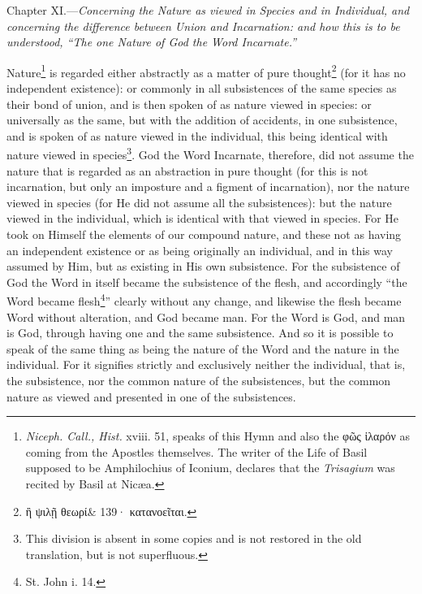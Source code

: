 Chapter XI.—\emph{Concerning the Nature as viewed in Species and in Individual, and concerning the difference between Union and Incarnation: and how this is to be understood, “The one Nature of God the Word Incarnate.”}

Nature\footnote{\emph{Niceph. Call., Hist. }xviii. 51, speaks of this Hymn and also the \textgreek{φῶς ἱλαρόν} as coming from the Apostles themselves. The writer of the Life of Basil supposed to be Amphilochius of Iconium, declares that the \emph{Trisagium }was recited by Basil at Nicæa.} is regarded either abstractly as a matter of pure thought\footnote{\textgreek{ἢ ψιλῇ θεωρί\& 139· κατανοεῖται}.} (for it has no independent existence): or commonly in all subsistences of the same species as their bond of union, and is then spoken of as nature viewed in species: or universally as the same, but with the addition of accidents, in one subsistence, and is spoken of as nature viewed in the individual, this being identical with nature viewed in species\footnote{This division is absent in some copies and is not restored in the old translation, but is not superfluous.}. God the Word Incarnate, therefore, did not assume the nature that is regarded as an abstraction in pure thought (for this is not incarnation, but only an imposture and a figment of incarnation), nor the nature viewed in species (for He did not assume all the subsistences): but the nature viewed in the individual, which is identical with that viewed in species. For He took on Himself the elements of our compound nature, and these not as having an independent existence or as being originally an individual, and in this way assumed by Him, but as existing in His own subsistence. For the subsistence of God the Word in itself became the subsistence of the flesh, and accordingly “the Word became flesh\footnote{St. John i. 14.}” clearly without any change, and likewise the flesh became Word without alteration, and God became man. For the Word is God, and man is God, through having one and the same subsistence. And so it is possible to speak of the same thing as being the nature of the Word and the nature in the individual. For it signifies strictly and exclusively neither the individual, that is, the subsistence, nor the common nature of the subsistences, but the common nature as viewed and presented in one of the subsistences.

